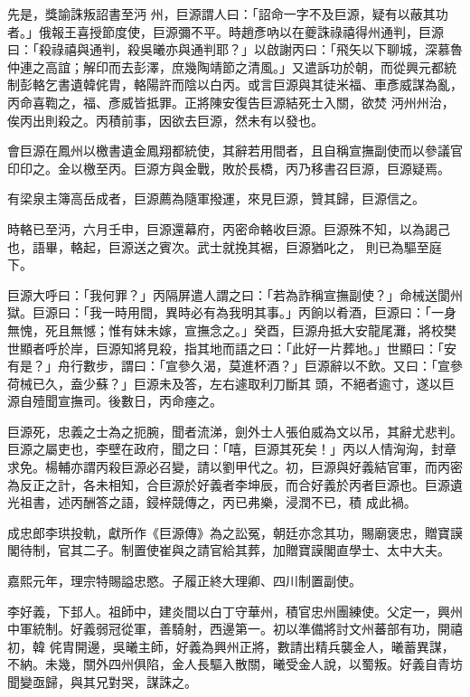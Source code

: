\begin{pinyinscope}
 先是，獎諭誅叛詔書至沔
 州，巨源謂人曰：「詔命一字不及巨源，疑有以蔽其功者。」俄報王喜授節度使，巨源彌不平。時趙彥吶以在夔誅祿禧得州通判，巨源曰：「殺祿禧與通判，殺吳曦亦與通判耶？」以啟謝丙曰：「飛矢以下聊城，深慕魯仲連之高誼；解印而去彭澤，庶幾陶靖節之清風。」又遣訴功於朝，而從興元都統制彭輅乞書遺韓侂胄，輅陽許而陰以白丙。或言巨源與其徒米福、車彥威謀為亂，丙命喜鞫之，福、彥威皆抵罪。正將陳安復告巨源結死士入關，欲焚
 沔州州治，俟丙出則殺之。丙積前事，因欲去巨源，然未有以發也。



 會巨源在鳳州以檄書遺金鳳翔都統使，其辭若用間者，且自稱宣撫副使而以參議官印印之。金以檄至丙。巨源方與金戰，敗於長橋，丙乃移書召巨源，巨源疑焉。



 有梁泉主簿高岳成者，巨源薦為隨軍撥運，來見巨源，贊其歸，巨源信之。



 時輅已至沔，六月壬申，巨源還幕府，丙密命輅收巨源。巨源殊不知，以為謁己也，語畢，輅起，巨源送之賓次。武士就挽其裾，巨源猶叱之，
 則已為驅至庭下。



 巨源大呼曰：「我何罪？」丙隔屏遣人謂之曰：「若為詐稱宣撫副使？」命械送閬州獄。巨源曰：「我一時用間，異時必有為我明其事。」丙餉以肴酒，巨源曰：「一身無愧，死且無憾；惟有妹未嫁，宣撫念之。」癸酉，巨源舟抵大安龍尾灘，將校樊世顯者呼於岸，巨源知將見殺，指其地而語之曰：「此好一片葬地。」世顯曰：「安有是？」舟行數步，謂曰：「宣參久渴，莫進杯酒？」巨源辭以不飲。又曰：「宣參荷械已久，盍少蘇？」巨源未及答，左右遽取利刀斷其
 頭，不絕者逾寸，遂以巨源自殪聞宣撫司。後數日，丙命瘞之。



 巨源死，忠義之士為之扼腕，聞者流涕，劍外士人張伯威為文以吊，其辭尤悲判。巨源之屬吏也，李壁在政府，聞之曰：「嘻，巨源其死矣！」丙以人情洶洶，封章求免。楊輔亦謂丙殺巨源必召變，請以劉甲代之。初，巨源與好義結官軍，而丙密為反正之計，各未相知，合巨源於好義者李坤辰，而合好義於丙者巨源也。巨源遺光祖書，述丙酬答之語，鋟梓競傳之，丙已弗樂，浸潤不已，積
 成此禍。



 成忠郎李珙投軌，獻所作《巨源傳》為之訟冤，朝廷亦念其功，賜廟褒忠，贈寶謨閣待制，官其二子。制置使崔與之請官給其葬，加贈寶謨閣直學士、太中大夫。



 嘉熙元年，理宗特賜謚忠愍。子履正終大理卿、四川制置副使。



 李好義，下邽人。祖師中，建炎間以白丁守華州，積官忠州團練使。父定一，興州中軍統制。好義弱冠從軍，善騎射，西邊第一。初以準備將討文州蕃部有功，開禧初，韓
 侂胄開邊，吳曦主師，好義為興州正將，數請出精兵襲金人，曦蓄異謀，不納。未幾，關外四州俱陷，金人長驅入散關，曦受金人說，以蜀叛。好義自青坊聞變亟歸，與其兄對哭，謀誅之。




\end{pinyinscope}
